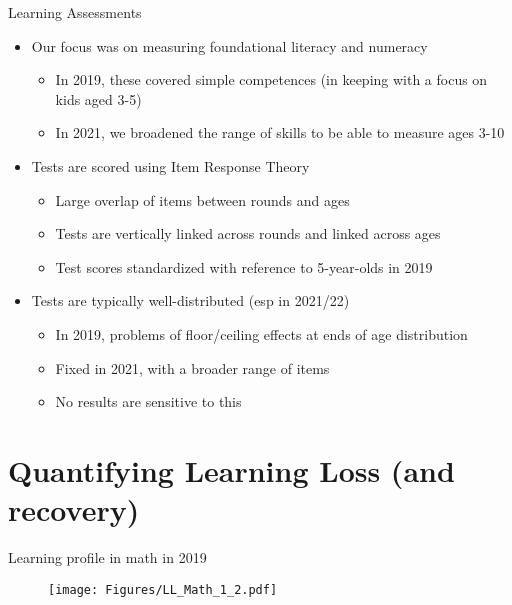 \documentclass[aspectratio=169,numbering=none]{beamer}
\begin{document}
\begin{frame}[plain]{Learning Assessments}
\begin{itemize}
\vfill \item Our focus was on measuring foundational literacy and numeracy
\begin{itemize}
   \vfill \item In 2019, these covered simple competences (in keeping with a focus on kids aged 3-5)
   \vfill \item In 2021, we broadened the range of skills to be able to measure ages 3-10 
\end{itemize}
\pause
\vfill \item Tests are scored using Item Response Theory
\begin{itemize}
   \vfill \item Large overlap of items between rounds and ages
   \vfill \item Tests are vertically linked across rounds and linked across ages
   \vfill \item Test scores standardized with reference to 5-year-olds in 2019
\end{itemize}
\pause
\vfill \item Tests are typically well-distributed (esp in 2021/22)
\begin{itemize}
   \vfill \item In 2019, problems of floor/ceiling effects at ends of age distribution
   \vfill \item Fixed in 2021, with a broader range of items
   \vfill \item No results are sensitive to this
\end{itemize}
\end{itemize}
\end{frame}




\section{Quantifying Learning Loss (and recovery)}

\begin{frame}[plain]{Learning profile in math in 2019}
\begin{figure}[H]
\begin{center}
\texttt{[image: Figures/LL\_Math\_1\_2.pdf]} 
\end{center}
\end{figure}
\end{frame}
\end{document}
